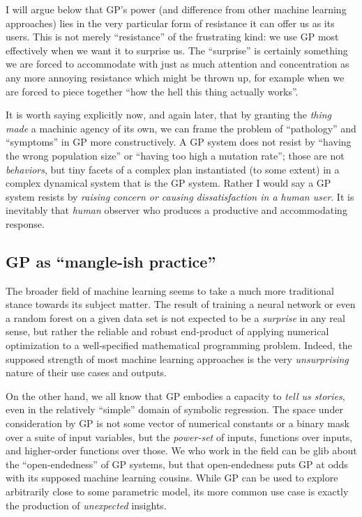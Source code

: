I will argue below that GP's power (and difference from other machine learning approaches) lies in the very particular form of resistance it can offer us as its users. This is not merely ``resistance'' of the frustrating kind: we use GP most effectively when we want it to surprise us. The ``surprise'' is certainly something we are forced to accommodate with just as much attention and concentration as any more annoying resistance which might be thrown up, for example when we are forced to piece together ``how the hell this thing actually works''.

It is worth saying explicitly now, and again later, that by granting the \emph{thing made} a machinic agency of its own, we can frame the problem of ``pathology'' and ``symptoms'' in GP more constructively. A GP system does not resist by ``having the wrong population size'' or ``having too high a mutation rate''; those are not \emph{behaviors}, but tiny facets of a complex plan instantiated (to some extent) in a complex dynamical system that is the GP system. Rather I would say a GP system resists by \emph{raising concern or causing dissatisfaction in a human user}. It is inevitably that \emph{human} observer who produces a productive and accommodating response.

\subsection{GP as ``mangle-ish practice''}\hypertarget{gp-as-mangle-ish-practice}{}\label{gp-as-mangle-ish-practice}

The broader field of machine learning seems to take a much more traditional stance towards its subject matter. The result of training a neural network or even a random forest on a given data set is not expected to be a \emph{surprise} in any real sense, but rather the reliable and robust end-product of applying numerical optimization to a well-specified mathematical programming problem. Indeed, the supposed strength of most machine learning approaches is the very \emph{unsurprising} nature of their use cases and outputs.

On the other hand, we all know that GP embodies a capacity to \emph{tell us stories}, even in the relatively ``simple'' domain of symbolic regression. The space under consideration by GP is not some vector of numerical constants or a binary mask over a suite of input variables, but the \emph{power-set} of inputs, functions over inputs, and higher-order functions over those. We who work in the field can be glib about the ``open-endedness'' of GP systems, but that open-endedness puts GP at odds with its supposed machine learning cousins. While GP can be used to explore arbitrarily close to some parametric model, its more common use case is exactly the production of \emph{unexpected} insights.

